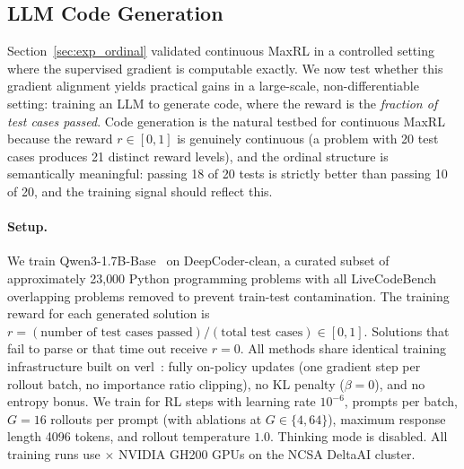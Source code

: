 \subsection{LLM Code Generation}
\label{sec:exp_llm}

Section~\ref{sec:exp_ordinal} validated continuous MaxRL in a controlled setting where the supervised gradient is computable exactly. We now test whether this gradient alignment yields practical gains in a large-scale, non-differentiable setting: training an LLM to generate code, where the reward is the \emph{fraction of test cases passed}. Code generation is the natural testbed for continuous MaxRL because the reward $r \in [0,1]$ is genuinely continuous (a problem with 20 test cases produces 21 distinct reward levels), and the ordinal structure is semantically meaningful: passing 18 of 20 tests is strictly better than passing 10 of 20, and the training signal should reflect this.

\paragraph{Setup.} We train Qwen3-1.7B-Base~\citep{qwen2025qwen25} on DeepCoder-clean, a curated subset of approximately 23{,}000 Python programming problems with all LiveCodeBench~\citep{jain2024livecodebench} overlapping problems removed to prevent train-test contamination. The training reward for each generated solution is $r = (\text{number of test cases passed}) / (\text{total test cases}) \in [0,1]$. Solutions that fail to parse or that time out receive $r = 0$. All methods share identical training infrastructure built on verl~\citep{sheng2024verl}: fully on-policy updates (one gradient step per rollout batch, no importance ratio clipping), no KL penalty ($\beta = 0$), and no entropy bonus. We train for  RL steps with learning rate $10^{-6}$,  prompts per batch, $G = 16$ rollouts per prompt (with ablations at $G \in \{4, 64\}$), maximum response length 4096 tokens, and rollout temperature $1.0$. Thinking mode is disabled. All training runs use $\times$ NVIDIA GH200 GPUs on the NCSA DeltaAI cluster.

